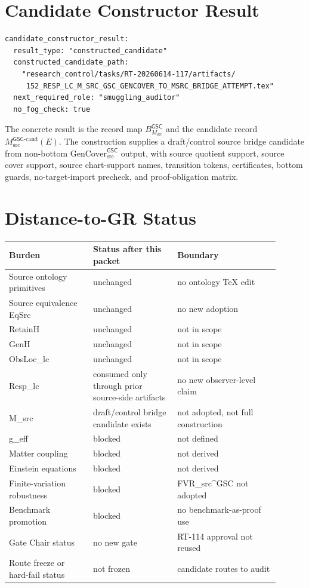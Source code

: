 \documentclass[11pt]{article}
\newcommand{\GSC}{\mathsf{GSC}}
\newcommand{\Msrc}{M_{\mathrm{src}}}
\newcommand{\GenCover}{\mathrm{GenCover}_{\mathrm{src}}^{\GSC}}
\begin{document}
\section{Candidate Constructor Result}

\begin{verbatim}
candidate_constructor_result:
  result_type: "constructed_candidate"
  constructed_candidate_path:
    "research_control/tasks/RT-20260614-117/artifacts/
     152_RESP_LC_M_SRC_GSC_GENCOVER_TO_MSRC_BRIDGE_ATTEMPT.tex"
  next_required_role: "smuggling_auditor"
  no_fog_check: true
\end{verbatim}

The concrete result is the record map \(B_{\Msrc}^{\GSC}\) and the candidate
record \(\Msrc^{\GSC\mbox{-}\mathrm{cand}}(E)\). The construction supplies a
draft/control source bridge candidate from non-bottom \(\GenCover\) output,
with source quotient support, source cover support, source chart-support names,
transition tokens, certificates, bottom guards, no-target-import precheck, and
proof-obligation matrix.

\section{Distance-to-GR Status}

\begin{longtable}{|p{0.28\linewidth}|p{0.28\linewidth}|p{0.34\linewidth}|}
\hline
\textbf{Burden} & \textbf{Status after this packet} & \textbf{Boundary} \\
\hline
Source ontology primitives & unchanged & no ontology TeX edit \\
\hline
Source equivalence EqSrc & unchanged & no new adoption \\
\hline
RetainH & unchanged & not in scope \\
\hline
GenH & unchanged & not in scope \\
\hline
ObsLoc_lc & unchanged & not in scope \\
\hline
Resp_lc & consumed only through prior source-side artifacts & no new observer-level claim \\
\hline
M_src & draft/control bridge candidate exists & not adopted, not full construction \\
\hline
g_eff & blocked & not defined \\
\hline
Matter coupling & blocked & not derived \\
\hline
Einstein equations & blocked & not derived \\
\hline
Finite-variation robustness & blocked & FVR_src^GSC not adopted \\
\hline
Benchmark promotion & blocked & no benchmark-as-proof use \\
\hline
Gate Chair status & no new gate & RT-114 approval not reused \\
\hline
Route freeze or hard-fail status & not frozen & candidate routes to audit \\
\hline
\end{longtable}
\end{document}
